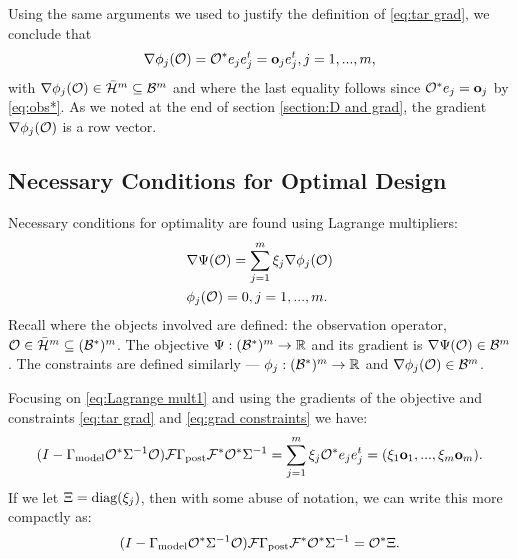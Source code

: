 \documentclass{amsart}
\numberwithin{equation}{section}
\begin{document}
Using the same arguments we used to justify the definition of
\eqref{eq:tar grad}, we conclude that
\begin{align}\label{eq:grad constraints}
\nabla \phi_j(\mathcal{O}) = \mathcal{O}^* e_j e_j^t = \mathbf{o}_j e_j^t , j=1,...,m,
\end{align}
with $\nabla \phi_j(\mathcal{O}) \in \bar{\mathcal{H}}^m \subseteq \mathcal{B}^m$ and where the
last equality follows since $\mathcal{O}^*e_j = \mathbf{o}_j$ by \eqref{eq:obs*}. As
we noted at the end of section \ref{section:D and grad}, the
gradient $\nabla \phi_j(\mathcal{O})$ is a row vector.

\subsection{Necessary Conditions for Optimal Design}\label{subsec:necessary}
Necessary conditions for optimality are found using Lagrange
multipliers:
\begin{align}
  &\nabla \Psi(\mathcal{O}) = \sum_{j=1}^m \xi_j \nabla \phi_j (\mathcal{O})
  \label{eq:Lagrange mult1} \\
    &\phi_j(\mathcal{O}) = 0, j = 1,...,m. \label{eq:Lagrange mult2}
\end{align}
Recall where the objects involved are defined: the observation operator,
$\mathcal{O} \in \bar{\mathcal{H}}^m \subseteq (\mathcal{B}^*)^m$. The objective $\Psi:
(\mathcal{B}^*)^m \to \mathbb{R}$ and its gradient is $\nabla \Psi(\mathcal{O}) \in
\mathcal{B}^m$. The constraints are defined similarly --- $\phi_j: (\mathcal{B}^*)^m
\to \mathbb{R}$ and $\nabla \phi_j(\mathcal{O}) \in \mathcal{B}^m$.

Focusing on \eqref{eq:Lagrange mult1} and using the gradients of the
objective and constraints \eqref{eq:tar grad} and \eqref{eq:grad
  constraints} we have:
\begin{equation*}
  (I - \Gamma_{\textup{model}} \mathcal{O}^* \Sigma^{-1} \mathcal{O}) \mathcal{F} \Gamma_{\textup{post}} \mathcal{F}^* \mathcal{O}^*\Sigma^{-1}
  = \sum_{j=1}^m \xi_j \mathcal{O}^* e_je_j^t = (\xi_1 \mathbf{o}_1,...,\xi_m \mathbf{o}_m).
\end{equation*}
If we let $\Xi = \textup{diag}(\xi_j)$, then with some abuse of
notation, we can write this more compactly as:
\begin{equation}\label{eq:conditions}
  ( I - \Gamma_{\textup{model}} \mathcal{O}^* \Sigma^{-1} \mathcal{O}) \mathcal{F} \Gamma_{\textup{post}} \mathcal{F}^* \mathcal{O}^*  \Sigma^{-1}
  = \mathcal{O}^* \Xi.
\end{equation}
\end{document}
